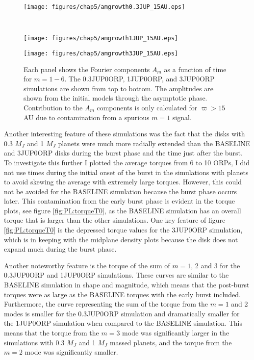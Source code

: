 \begin{figure}[p]
\centering
{}
\begin{minipage}[t]{6.3in}
\centering
\texttt{[image: figures/chap5/amgrowth0.3JUP\_15AU.eps]}
\end{minipage}\\
\begin{minipage}[t]{6.3in}
\centering
\texttt{[image: figures/chap5/amgrowth1JUP\_15AU.eps]}
\end{minipage}
\begin{minipage}[t]{6.3in}
\centering
\texttt{[image: figures/chap5/amgrowth3JUP\_15AU.eps]}
\end{minipage}
\caption[Fourier components as a function of time for different planet masses inserted at $T = 0$]{Each panel shows the Fourier components $A_m$ as a function of time for $m = 1 - 6$. The 0.3JUP0ORP, 1JUP0ORP, and 3JUP0ORP simulations are shown from top to bottom. The amplitudes are shown from the initial models through the asymptotic phase. Contribution to the $A_m$ components is only calculated for $\varpi > 15$AU due to contamination from a spurious $m = 1$ signal.}
\label{fig:PL:amt}
\end{figure}

Another interesting feature of these simulations was the fact that the disks with 0.3 $M_J$ and 1 $M_J$ planets were much more radially extended than the BASELINE and 3JUP0ORP disks during the burst phase and the time just after the burst. To investigate this further I plotted the average torques from 6 to 10 ORPs, I did not use times during the initial onset of the burst in the simulations with planets to avoid skewing the average with extremely large torques. However, this could not be avoided for the BASELINE simulation because the burst phase occurs later. This contamination from the early burst phase is evident in the torque plots, see figure \ref{fig:PL:torqueT0}, as the BASELINE simulation has an overall torque that is larger than the other simulations. One key feature of figure \ref{fig:PL:torqueT0} is the depressed torque values for the 3JUP0ORP simulation, which is in keeping with the midplane density plots because the disk does not expand much during the burst phase. 

Another noteworthy feature is the torque of the sum of $m = 1$, 2 and 3 for the 0.3JUP0ORP and 1JUP0ORP simulations. These curves are similar to the BASELINE simulation in shape and magnitude, which means that the post-burst torques were as large as the BASELINE torques with the early burst included. Furthermore, the curve representing the sum of the torque from the $m = 1$ and 2 modes is smaller for the 0.3JUP0ORP simulation and dramatically smaller for the 1JUP0ORP simulation when compared to the BASELINE simulation. This means that the torque from the $m= 3$ mode was significantly larger in the simulations with 0.3 $M_J$ and 1 $M_J$ massed planets, and the torque from the $m = 2$ mode was significantly smaller.

